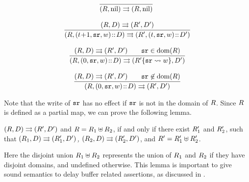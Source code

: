 {\small
$$
\begin{array}{c}
\!\!
\infer
{\Dstep{(\RFile, \nil)}{(\RFile,\nil)}}
{}
\\
\\
%
%
\infer
{\Dstep{(\RFile, (\tick\!+\!1, \sr, \word)\dbCons\DBuf)}
       {(\RFile', (\tick, \sr, \word)\dbCons\DBuf')}}
{\Dstep{(\RFile, \DBuf)}{(\RFile', \DBuf')}}
\\
\\
\infer
{\Dstep{(\RFile, (0, \sr, \word)\dbCons\DBuf)}{(\fsubst{\RFile'}\sr\word, \DBuf')}}
{\Dstep{(\RFile, \DBuf)}{(\RFile', \DBuf')}
\qquad \sr\in\dom(\RFile)
}
%
\\
\\
%
\infer
{\Dstep{(\RFile, (0, \sr, \word)\dbCons\DBuf)}{(\RFile', \DBuf')}}
{\Dstep{(\RFile, \DBuf)}{(\RFile', \DBuf')}
 \qquad \sr\not\in\dom(\RFile)
}
\end{array}
$$
}

Note that the write of $\texttt{sr}$ has no effect if $\texttt{sr}$ is not
in the domain of $R$. Since $R$ is defined as a partial
map, we can prove the following lemma.
\begin{lemma}
	\label{lemma:RFileSplitExDelay}
	{\em ${(R, D)}\rightrightarrows{(R', D')}$}
    and {\em $R = R_1 \uplus R_2$},
    if and only if
    there exist {\em $R_1'$} and {\em $R_2'$}, such that
    {\em ${(R_1, D)}\rightrightarrows{(R_1', D')}$, ${(R_2, D)}\rightrightarrows{(R_2', D')}$},
    and {\em $R' = R_1' \uplus R_2'$}.
\end{lemma}
Here the disjoint union $R_1 \uplus R_2$ represents the union of
$R_1$ and $R_2$ if they have disjoint domains, and undefined
otherwise. This lemma is important to give sound semantics
to delay buffer related assertions, as discussed in
\Sec{\ref{sec:logic}}.



